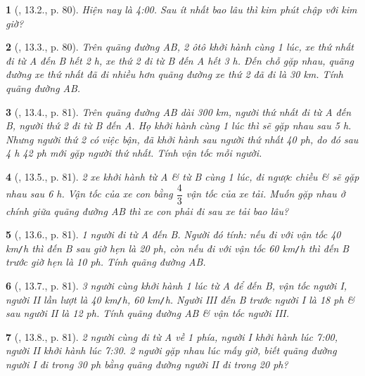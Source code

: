 \documentclass{article}
\newtheorem{baitoan}{}
\begin{document}
\begin{baitoan}[\cite{TLCT_THCS_Toan_6_so_hoc}, 13.2., p. 80]
	Hiện nay là {\rm4:00}. Sau ít nhất bao lâu thì kim phút chập với kim giờ?
\end{baitoan}

\begin{baitoan}[\cite{TLCT_THCS_Toan_6_so_hoc}, 13.3., p. 80]
	Trên quãng đường AB, 2 ôtô khởi hành cùng 1 lúc, xe thứ nhất đi từ A đến B hết {\rm2 h}, xe thứ 2 đi từ B đến A hết {\rm3 h}. Đến chỗ gặp nhau, quãng đường xe thứ nhất đã đi nhiều hơn quãng đường xe thứ 2 đã đi là {\rm30 km}. Tính quãng đường AB.
\end{baitoan}

\begin{baitoan}[\cite{TLCT_THCS_Toan_6_so_hoc}, 13.4., p. 81]
	Trên quãng đường AB dài {\rm300 km}, người thứ nhất đi từ A đến B, người thứ 2 đi từ B đến A. Họ khởi hành cùng 1 lúc thì sẽ gặp nhau sau {\rm5 h}. Nhưng người thứ 2 có việc bận, đã khởi hành sau người thứ nhất {\rm40 ph}, do đó sau {\rm4 h 42 ph} mới gặp người thứ nhất. Tính vận tốc mỗi người.
\end{baitoan}

\begin{baitoan}[\cite{TLCT_THCS_Toan_6_so_hoc}, 13.5., p. 81]
	2 xe khởi hành từ A \& từ B cùng 1 lúc, đi ngược chiều \& sẽ gặp nhau sau {\rm6 h}. Vận tốc của xe con bằng $\dfrac{4}{3}$ vận tốc của xe tải. Muốn gặp nhau ở chính giữa quãng đường AB thì xe con phải đi sau xe tải bao lâu?
\end{baitoan}

\begin{baitoan}[\cite{TLCT_THCS_Toan_6_so_hoc}, 13.6., p. 81]
	1 người đi từ A đến B. Người đó tính: nếu đi với vận tốc {\rm40 km{\tt/}h} thì đến B sau giờ hẹn là {\rm20 ph}, còn nếu đi với vận tốc {\rm60 km{\tt/}h} thì đến B trước giờ hẹn là {\rm10 ph}. Tính quãng đường AB.
\end{baitoan}

\begin{baitoan}[\cite{TLCT_THCS_Toan_6_so_hoc}, 13.7., p. 81]
	3 người cùng khởi hành 1 lúc từ A để đến B, vận tốc người I, người II lần lượt là {\rm40 km{\tt/}h, 60 km{\tt/}h}. Người III đến B trước người I là {\rm18 ph} \& sau người II là {\rm12 ph}. Tính quãng đường AB \& vận tốc người III. 
\end{baitoan}

\begin{baitoan}[\cite{TLCT_THCS_Toan_6_so_hoc}, 13.8., p. 81]
	2 người cùng đi từ A về 1 phía, người I khởi hành lúc {\rm7:00}, người II khởi hành lúc {\rm7:30}. 2 người gặp nhau lúc mấy giờ, biết quãng đường người I đi trong {\rm30 ph} bằng quãng đường người II đi trong {\rm20 ph}?
\end{baitoan}
\end{document}
